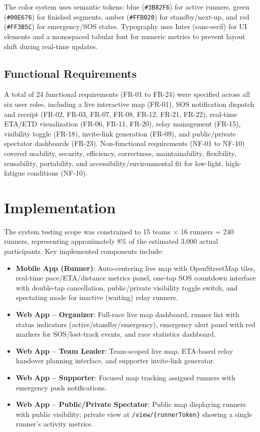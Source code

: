 \documentclass[conference]{IEEEtran}
\begin{document}
The color system uses semantic tokens: blue (\texttt{\#3B82F6}) for active runners, green (\texttt{\#00E676}) for finished segments, amber (\texttt{\#FFB020}) for standby/next-up, and red (\texttt{\#FF3B5C}) for emergency/SOS states. Typography uses Inter (sans-serif) for UI elements and a monospaced tabular font for numeric metrics to prevent layout shift during real-time updates.

\subsection{Functional Requirements}
A total of 24 functional requirements (FR-01 to FR-24) were specified across all six user roles, including a live interactive map (FR-01), SOS notification dispatch and receipt (FR-02, FR-03, FR-07, FR-08, FR-12, FR-21, FR-22), real-time ETA/ETD visualization (FR-06, FR-11, FR-20), relay management (FR-15), visibility toggle (FR-18), invite-link generation (FR-09), and public/private spectator dashboards (FR-23). Non-functional requirements (NF-01 to NF-10) covered usability, security, efficiency, correctness, maintainability, flexibility, reusability, portability, and accessibility/environmental fit for low-light, high-fatigue conditions (NF-10).

\section{Implementation}

The system testing scope was constrained to 15 teams $\times$ 16 runners = 240 runners, representing approximately 8\% of the estimated 3,000 actual participants. Key implemented components include:

\begin{itemize}
    \item \textbf{Mobile App (Runner)}: Auto-centering live map with OpenStreetMap tiles, real-time pace/ETA/distance metrics panel, one-tap SOS countdown interface with double-tap cancellation, public/private visibility toggle switch, and spectating mode for inactive (waiting) relay runners.
    \item \textbf{Web App -- Organizer}: Full-race live map dashboard, runner list with status indicators (active/standby/emergency), emergency alert panel with red markers for SOS/lost-track events, and race statistics dashboard.
    \item \textbf{Web App -- Team Leader}: Team-scoped live map, ETA-based relay handover planning interface, and supporter invite-link generator.
    \item \textbf{Web App -- Supporter}: Focused map tracking assigned runners with emergency push notifications.
    \item \textbf{Web App -- Public/Private Spectator}: Public map displaying runners with public visibility; private view at \texttt{/view/\{runnerToken\}} showing a single runner's activity metrics.
\end{itemize}
\end{document}

